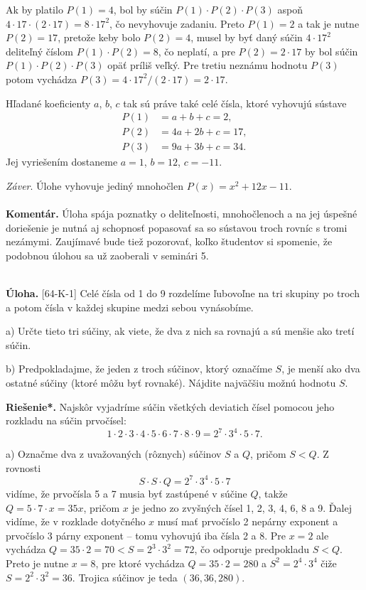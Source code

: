 \documentclass[11pt,a4paper,oneside,final]{book}
\newcommand{\kom}{\textbf{Komentár.} }
\newcommand{\ul}{\textbf{Úloha.} }
\newcommand{\rieh}{\textbf{Riešenie*.} }
\begin{document}
Ak by platilo $P(1) = 4$, bol by súčin $P(1)\cdot P(2)\cdot P(3)$ aspoň $4 \cdot 17 \cdot (2 \cdot 17) = 8 \cdot 17^2$, čo nevyhovuje zadaniu. Preto $P(1) = 2$ a tak je nutne $P(2) = 17$, pretože keby bolo $P(2) = 4$, musel by byť daný súčin $4 \cdot 17^2$ deliteľný číslom $P(1)\cdot P(2) = 8$, čo neplatí, a pre $P(2) = 2 \cdot 17$ by bol súčin $P(1)\cdot P(2)\cdot P(3)$ opäť príliš veľký. Pre tretiu neznámu
hodnotu $P(3)$ potom vychádza $P(3) = 4 \cdot 17^2 /(2 \cdot 17) = 2 \cdot 17$.

Hľadané koeficienty $a$, $b$, $c$ tak sú práve také celé čísla, ktoré vyhovujú sústave
\begin{align*}
P(1) &= a + b + c = 2,\\
P(2) &= 4a + 2b + c = 17,\\
P(3) &= 9a + 3b + c = 34.
\end{align*}
Jej vyriešením dostaneme $a = 1$, $b = 12$, $c = -11$.

\textit{Záver}. Úlohe vyhovuje jediný mnohočlen $P(x) = x^2 + 12x - 11$.\\
\\
\kom Úloha spája poznatky o deliteľnosti, mnohočlenoch a na jej úspešné doriešenie je nutná aj schopnosť popasovať sa so sústavou troch rovníc s tromi nezámymi. Zaujímavé bude tiež pozorovať, koľko študentov si spomenie, že podobnou úlohou sa už zaoberali v seminári 5.\\
\\
\begin{tcolorbox}[breakable,notitle,boxrule=0pt,colback=light-gray,colframe=light-gray]\ul [64-K-1]
Celé čísla od 1 do 9 rozdelíme ľubovoľne na tri skupiny po troch a potom čísla v každej skupine medzi sebou vynásobíme.

a) Určte tieto tri súčiny, ak viete, že dva z nich sa rovnajú a sú menšie ako tretí súčin.

b) Predpokladajme, že jeden z troch súčinov, ktorý označíme $S$, je menší ako dva ostatné súčiny (ktoré môžu byť rovnaké). Nájdite najväčšiu možnú hodnotu $S$.

\end{tcolorbox}

\rieh Najskôr vyjadríme súčin všetkých deviatich čísel pomocou jeho rozkladu na súčin prvočísel:
$$ 1 \cdot 2 \cdot 3 \cdot 4 \cdot 5 \cdot 6 \cdot 7 \cdot 8 \cdot 9 = 2^7 \cdot 3^4 \cdot 5 \cdot 7.$$

a) Označme dva z uvažovaných (rôznych) súčinov $S$ a $Q$, pričom $S < Q$. Z rovnosti
$$S \cdot S \cdot Q = 2^7 \cdot 3^4 \cdot 5 \cdot 7$$
vidíme, že prvočísla 5 a 7 musia byť zastúpené v súčine $Q$, takže $Q = 5 \cdot 7 \cdot x = 35x$, pričom $x$ je jedno zo zvyšných čísel 1, 2, 3, 4, 6, 8 a 9. Ďalej vidíme, že v rozklade dotyčného $x$ musí mať prvočíslo 2 nepárny exponent a prvočíslo 3 párny exponent -- tomu vyhovujú iba čísla 2 a 8. Pre $x = 2$ ale vychádza $Q = 35 \cdot 2 = 70 < S= 2^3 \cdot 3^2 = 72$, čo odporuje predpokladu $S < Q$. Preto je nutne $x = 8$, pre ktoré vychádza $Q = 35 \cdot 2 = 280$ a $S^2 = 2^4 \cdot 3^4$ čiže $S = 2^2 \cdot 3^2 = 36$. Trojica súčinov je teda
$(36, 36, 280)$.
\end{document}
